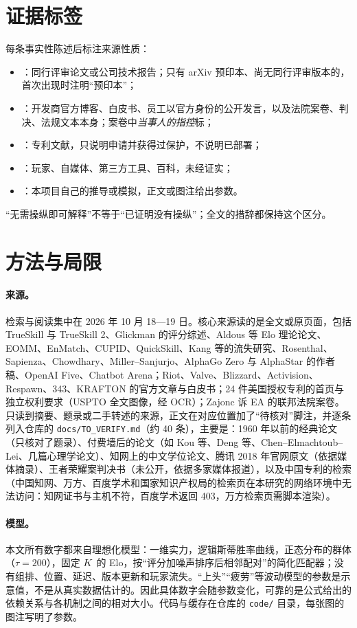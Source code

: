 \section*{证据标签}

每条事实性陈述后标注来源性质：
\begin{itemize}
  \item \tagLit：同行评审论文或公司技术报告；只有 arXiv 预印本、尚无同行评审版本的，首次出现时注明“预印本”；
  \item \tagOff：开发商官方博客、白皮书、员工以官方身份的公开发言，以及法院案卷、判决、法规文本本身；案卷中\emph{当事人的指控}标\tagCom；
  \item \tagPat：专利文献，只说明申请并获得过保护，不说明已部署；
  \item \tagCom：玩家、自媒体、第三方工具、百科，未经证实；
  \item \tagOwn：本项目自己的推导或模拟，正文或图注给出参数。
\end{itemize}
“无需操纵即可解释”不等于“已证明没有操纵”；全文的措辞都保持这个区分。

\section*{方法与局限}

\paragraph{来源。}检索与阅读集中在 2026 年 10 月 18—19 日。核心来源读的是全文或原页面，包括 TrueSkill 与 TrueSkill 2、Glickman 的评分综述、Aldous 等 Elo 理论论文、EOMM、EnMatch、CUPID、QuickSkill、Kang 等的流失研究、Rosenthal、Sapienza、Chowdhary、Miller–Sanjurjo、AlphaGo Zero 与 AlphaStar 的作者稿、OpenAI Five、Chatbot Arena；Riot、Valve、Blizzard、Activision、Respawn、343、KRAFTON 的官方文章与白皮书；24 件美国授权专利的首页与独立权利要求（USPTO 全文图像，经 OCR）；Zajonc 诉 EA 的联邦法院案卷。只读到摘要、题录或二手转述的来源，正文在对应位置加了“待核对”脚注，并逐条列入仓库的 \texttt{docs/TO\_VERIFY.md}（约 40 条），主要是：1960 年以前的经典论文（只核对了题录）、付费墙后的论文（如 Kou 等、Deng 等、Chen–Elmachtoub–Lei、几篇心理学论文）、知网上的中文学位论文、腾讯 2018 年官网原文（依据媒体摘录）、王者荣耀案判决书（未公开，依据多家媒体报道），以及中国专利的检索（中国知网、万方、百度学术和国家知识产权局的检索页在本研究的网络环境中无法访问：知网证书与主机不符，百度学术返回 403，万方检索页需脚本渲染）。

\paragraph{模型。}本文所有\tagOwn{}数字都来自理想化模型：一维实力，逻辑斯蒂胜率曲线，正态分布的群体（$\tau=200$），固定 $K$ 的 Elo，按“评分加噪声排序后相邻配对”的简化匹配器；没有组排、位置、延迟、版本更新和玩家流失。“上头”“疲劳”等波动模型的参数是示意值，不是从真实数据估计的。因此具体数字会随参数变化，可靠的是公式给出的依赖关系与各机制之间的相对大小。代码与缓存在仓库的 \texttt{code/} 目录，每张图的图注写明了参数。

